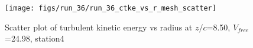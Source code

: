 \begin{figure}[H]
\centering
\texttt{[image: figs/run\_36/run\_36\_ctke\_vs\_r\_mesh\_scatter]}
\caption{Scatter plot of turbulent kinetic energy vs radius at $z/c$=8.50, $V_{free}$=24.98, station4}
\label{fig:run_36_ctke_vs_r_mesh_scatter}
\end{figure}


